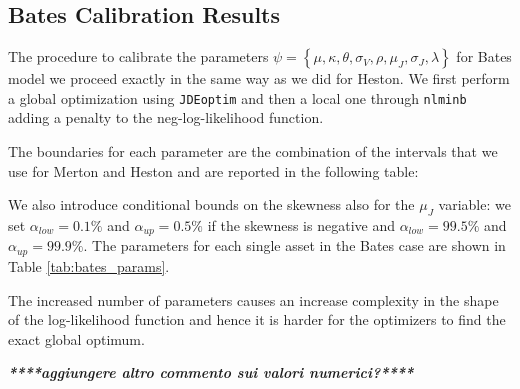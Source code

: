 \subsection{Bates Calibration Results}
The procedure to calibrate the parameters $\psi =  \left\{ \mu, \kappa, \theta, \sigma_V, \rho, \mu_J, \sigma_J, \lambda \right\}$ for Bates model we proceed exactly in the same way as we did for Heston. We first perform a global optimization using \texttt{JDEoptim} and then a local one through \texttt{nlminb} adding a penalty to the neg-log-likelihood function. 

The boundaries for each parameter are the combination of the intervals that we use for Merton and Heston and are reported in the following table:

\bigskip 

\begin{center}
	\noindent{}
\end{center}

\bigskip

We also introduce conditional bounds on the skewness also for the $\mu_J$ variable: we set $\alpha_{low} = 0.1\%$ and $\alpha_{up} = 0.5\%$ if the skewness is negative and $\alpha_{low} = 99.5\%$ and $\alpha_{up} = 99.9\%$.
The parameters for each single asset in the Bates case are shown in Table \ref{tab:bates_params}.

The increased number of parameters causes an increase complexity in the shape of the log-likelihood function and hence it is harder for the optimizers to find the exact global optimum.

\textit{\textbf{****aggiungere altro commento sui valori numerici?**** }}



